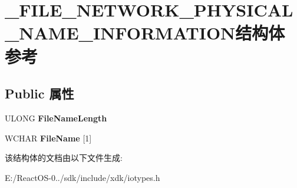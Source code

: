 \hypertarget{struct___f_i_l_e___n_e_t_w_o_r_k___p_h_y_s_i_c_a_l___n_a_m_e___i_n_f_o_r_m_a_t_i_o_n}{}\section{\+\_\+\+F\+I\+L\+E\+\_\+\+N\+E\+T\+W\+O\+R\+K\+\_\+\+P\+H\+Y\+S\+I\+C\+A\+L\+\_\+\+N\+A\+M\+E\+\_\+\+I\+N\+F\+O\+R\+M\+A\+T\+I\+O\+N结构体 参考}
\label{struct___f_i_l_e___n_e_t_w_o_r_k___p_h_y_s_i_c_a_l___n_a_m_e___i_n_f_o_r_m_a_t_i_o_n}
\subsection*{Public 属性}
\begin{DoxyCompactItemize}
\item 
\mbox{\label{struct___f_i_l_e___n_e_t_w_o_r_k___p_h_y_s_i_c_a_l___n_a_m_e___i_n_f_o_r_m_a_t_i_o_n_a60209f52f60d5da06eb69051304fbc6d}} 
U\+L\+O\+NG {\bfseries File\+Name\+Length}
\item 
\mbox{\label{struct___f_i_l_e___n_e_t_w_o_r_k___p_h_y_s_i_c_a_l___n_a_m_e___i_n_f_o_r_m_a_t_i_o_n_ae12e360fd9f86910cf091adf76a5733e}} 
W\+C\+H\+AR {\bfseries File\+Name} \mbox{[}1\mbox{]}
\end{DoxyCompactItemize}


该结构体的文档由以下文件生成\+:\begin{DoxyCompactItemize}
\item 
E\+:/\+React\+O\+S-\/0../sdk/include/xdk/iotypes.\+h\end{DoxyCompactItemize}
